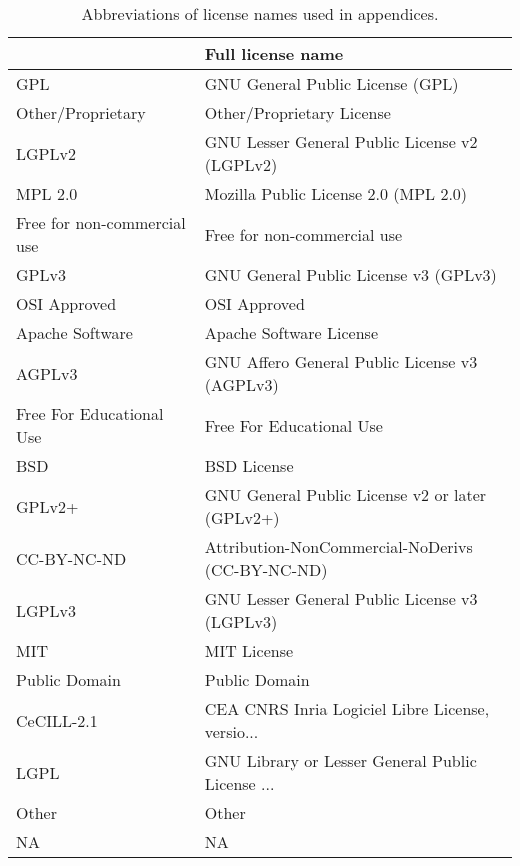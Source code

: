 \begin{table}
\centering
\caption{Abbreviations of license names used in appendices.}
\label{tab:keys-licenses}
\begin{tabular}{ll}
\toprule
{} &                                  Full license name \\
\midrule
GPL                          &                   GNU General Public License (GPL) \\
 Other/Proprietary           &                          Other/Proprietary License \\
LGPLv2                       &      GNU Lesser General Public License v2 (LGPLv2) \\
MPL 2.0                      &               Mozilla Public License 2.0 (MPL 2.0) \\
 Free for non-commercial use &                        Free for non-commercial use \\
GPLv3                        &              GNU General Public License v3 (GPLv3) \\
 OSI Approved                &                                       OSI Approved \\
 Apache Software             &                            Apache Software License \\
AGPLv3                       &      GNU Affero General Public License v3 (AGPLv3) \\
 Free For Educational Use    &                           Free For Educational Use \\
 BSD                         &                                        BSD License \\
GPLv2+                       &    GNU General Public License v2 or later (GPLv2+) \\
CC-BY-NC-ND                  &   Attribution-NonCommercial-NoDerivs (CC-BY-NC-ND) \\
LGPLv3                       &      GNU Lesser General Public License v3 (LGPLv3) \\
 MIT                         &                                        MIT License \\
 Public Domain               &                                      Public Domain \\
CeCILL-2.1                   &   CEA CNRS Inria Logiciel Libre License, versio... \\
LGPL                         &   GNU Library or Lesser General Public License ... \\
 Other                       &                                              Other \\
 NA                          &                                                 NA \\
\bottomrule
\end{tabular}
\end{table}

